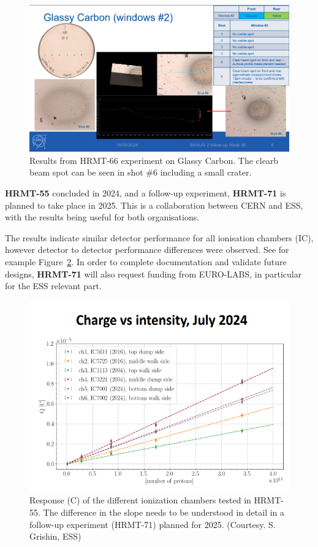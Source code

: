 \begin{figure}[!h]
    \centering
    \includegraphics[width=0.75\linewidth]{graphics/hiradmat_GC.png}
    \caption{Results from HRMT-66 experiment on Glassy Carbon. The clearb beam spot can be seen in shot \#6 including a small crater.}
    \label{fig:hiradmat_GC}
\end{figure}

\textbf{HRMT-55} concluded in 2024, and a follow-up experiment, \textbf{HRMT-71}
is planned to take place in 2025. This is a collaboration between CERN and ESS, with the results being useful for both organisations.

The results indicate similar detector performance for all ionisation chambers (IC), however detector to detector performance differences were observed. See for example Figure~\ref{fig:hiradmat_IC_response}. In order to complete documentation and validate future designs, \textbf{HRMT-71} will also request funding from EURO-LABS, in particular for the ESS relevant part. 

\begin{figure}[!h]
    \centering
    \includegraphics[width=0.8\linewidth]{graphics/hiradmat_IC_response.png}
    \caption{Response (C) of the different ionization chambers tested in HRMT-55. The difference in the slope needs to be understood in detail in a follow-up experiment (HRMT-71) planned for 2025. (Courtesy. S. Grishin, ESS)}
    \label{fig:hiradmat_IC_response}
\end{figure}

